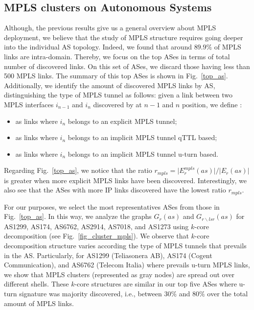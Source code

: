 \subsection{MPLS clusters on Autonomous Systems}\label{cluster.as}
Although, the previous results give us a general overview about MPLS deployment,
we believe that the study of MPLS structure requires going deeper into the
individual AS topology. Indeed, we found that around $89.9\%$ of MPLS links are
intra-domain. Thereby, we focus on the top ASes in terms of total number of
discovered links.  On this set of ASes, we discard those having less than 500
MPLS links. The summary of this top ASes is shown in Fig.~\ref{top_as}.
Additionally, we identify the amount of discovered MPLS links by AS,
distinguishing the type of MPLS tunnel as follows: given a link between two MPLS
interfaces $i_{n-1}$  and $i_{n}$ discovered by \traceroute at $n-1$ and $n$
position, we define :
\begin{itemize}
  \item {} as links  where $i_{n}$ belongs to an explicit
  MPLS tunnel;
  \item {} as links  where $i_{n}$ belongs  to an implicit
  MPLS tunnel qTTL based;
  \item {} as links where $i_{n}$ belongs to an
  implicit MPLS tunnel u-turn based.
\end{itemize}

Regarding Fig.~\ref{top_as}, we notice that the ratio $r_{mpls}= \vert E^{mpls}_{r} (as)
\vert /\vert E_{r} (as) \vert $ is greater when more explicit MPLS links have
been discovered. Interestingly, we also see that the ASes with more IP links
discovered have the lowest ratio $r_{mpls}$. 

For our purposes, we select the most representatives ASes from those in
Fig.~\ref{top_as}. In this way, we analyze the graphs $G_{r}(as)$ and
$G_{r\backslash lsr}(as)$ for AS1299, AS174, AS6762, AS2914, AS7018, and AS1273
using $k$-core decomposition (see Fig.~\ref{fig_cluster_mpls}). We observe that
$k$-core decomposition structure varies according the type of MPLS tunnels that
prevails in the AS. Particularly, for  AS1299 (Teliasonera AB), AS174 (Cogent
Communication), and AS6762 (Telecom Italia) where prevails u-turn MPLS links, we
show that MPLS clusters (represented as gray nodes) are spread out over
different shells. These $k$-core structures are similar in our top five ASes
where u-turn signature was majority discovered, i.e., between $30\%$ and $80\%$
over the total amount of MPLS links.

